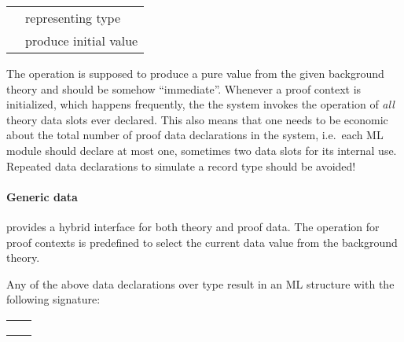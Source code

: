 \begin{isabellebody}
\begin{isamarkuptext}
  \medskip
  \begin{tabular}{ll}
  \isa{{\isaliteral{5C3C747970653E}{\isasymtype}}\ T} & representing type \\
  \isa{{\isaliteral{5C3C76616C3E}{\isasymval}}\ init{\isaliteral{3A}{\isacharcolon}}\ theory\ {\isaliteral{5C3C72696768746172726F773E}{\isasymrightarrow}}\ T} & produce initial value \\
  \end{tabular}
  \medskip

  The  operation is supposed to produce a pure value
  from the given background theory and should be somehow
  ``immediate''.  Whenever a proof context is initialized, which
  happens frequently, the the system invokes the 
  operation of \emph{all} theory data slots ever declared.  This also
  means that one needs to be economic about the total number of proof
  data declarations in the system, i.e.\ each ML module should declare
  at most one, sometimes two data slots for its internal use.
  Repeated data declarations to simulate a record type should be
  avoided!

  \paragraph{Generic data} provides a hybrid interface for both theory
  and proof data.  The  operation for proof contexts is
  predefined to select the current data value from the background
  theory.

  \bigskip Any of the above data declarations over type 
  result in an ML structure with the following signature:

  \medskip
  \begin{tabular}{ll}
  \isa{get{\isaliteral{3A}{\isacharcolon}}\ context\ {\isaliteral{5C3C72696768746172726F773E}{\isasymrightarrow}}\ T} \\
  \isa{put{\isaliteral{3A}{\isacharcolon}}\ T\ {\isaliteral{5C3C72696768746172726F773E}{\isasymrightarrow}}\ context\ {\isaliteral{5C3C72696768746172726F773E}{\isasymrightarrow}}\ context} \\
  \isa{map{\isaliteral{3A}{\isacharcolon}}\ {\isaliteral{28}{\isacharparenleft}}T\ {\isaliteral{5C3C72696768746172726F773E}{\isasymrightarrow}}\ T{\isaliteral{29}{\isacharparenright}}\ {\isaliteral{5C3C72696768746172726F773E}{\isasymrightarrow}}\ context\ {\isaliteral{5C3C72696768746172726F773E}{\isasymrightarrow}}\ context} \\
  \end{tabular}
  \medskip


\end{isamarkuptext}
\end{isabellebody}
